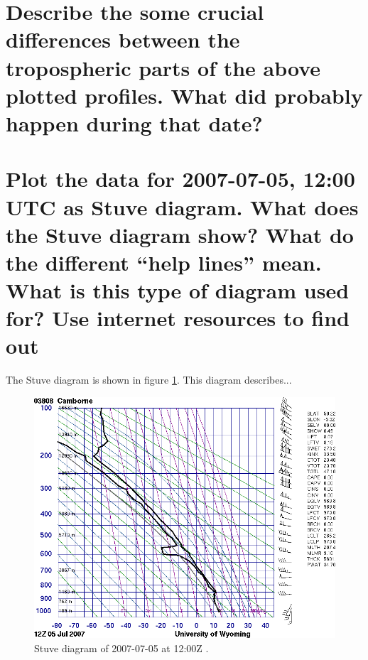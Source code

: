 \documentclass{article}
\begin{document}
\section{Describe the some crucial differences between the tropospheric parts of the above plotted profiles. What did probably happen during that date?}



\newpage
\section{Plot the data for 2007-07-05, 12:00 UTC as Stuve diagram. What does the Stuve diagram show? What do the different “help lines” mean. What is this type of diagram used for? Use internet resources to find out}
The Stuve diagram is shown in figure \ref{fig:Q7}. This diagram describes...

\begin{figure}[H]
	\centering
	\includegraphics[width=.8\textwidth]{figures/stuve.png}
	\caption{Stuve diagram of 2007-07-05 at 12:00Z \cite{assignment}.}
	\label{fig:Q7}
\end{figure}

\newpage				%


\end{document}
